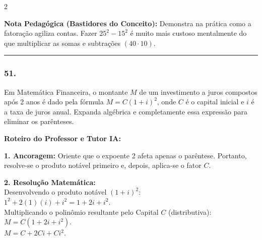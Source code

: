 \begin{multicols*}{2}
    \begin{boxexplicacao}
    \textbf{Nota Pedagógica (Bastidores do Conceito):} Demonstra na prática como a fatoração agiliza contas. Fazer $25^2 - 15^2$ é muito mais custoso mentalmente do que multiplicar as somas e subtrações $(40 \cdot 10)$.
    \end{boxexplicacao}
\fi

\par\vspace{\espacoQuestao}

\noindent\textcolor{CorLinha}{\rule{\linewidth}{0.5pt}} 
\par\vspace{\espacoPreQuestao}
\subsubsection*{51.} 
\begin{enunciadoLiteral}
Em Matemática Financeira, o montante $M$ de um investimento a juros compostos após 2 anos é dado pela fórmula $M = C(1 + i)^2$, onde $C$ é o capital inicial e $i$ é a taxa de juros anual. 
Expanda algébrica e completamente essa expressão para eliminar os parênteses.
\end{enunciadoLiteral}

\ifgabarito
    \begin{tcolorbox}[colback=CorTitUm!5, colframe=CorTitUm, boxrule=1pt, arc=4pt, left=6pt, right=6pt, top=6pt, bottom=6pt]
    \small\textbf{\textcolor{CorTitUm}{Roteiro do Professor e Tutor IA:}}\par\vspace{0.1cm}
    \color{CinzaEscuro}
    \textbf{1. Ancoragem:} Oriente que o expoente 2 afeta apenas o parêntese. Portanto, resolve-se o produto notável primeiro e, depois, aplica-se o fator $C$.\par\vspace{0.1cm}
    \textbf{2. Resolução Matemática:}\\
    Desenvolvendo o produto notável $(1 + i)^2$:\\
    $1^2 + 2(1)(i) + i^2 = 1 + 2i + i^2$.\\
    Multiplicando o polinômio resultante pelo Capital $C$ (distributiva):\\
    $M = C(1 + 2i + i^2)$.\\
    $M = C + 2Ci + Ci^2$.
    \end{tcolorbox}
\fi


\end{multicols*}

